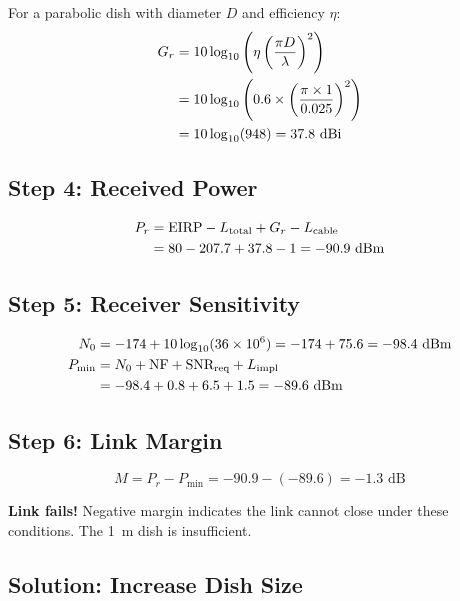 For a parabolic dish with diameter $D$ and efficiency $\eta$:
\begin{align}
G_r &= 10\log_{10}\left(\eta \left(\frac{\pi D}{\lambda}\right)^2\right) \notag \\
&= 10\log_{10}\left(0.6 \times \left(\frac{\pi \times 1}{0.025}\right)^2\right) \notag \\
&= 10\log_{10}(948) = 37.8\text{~dBi}
\label{eq:ex2-rx-gain}
\end{align}

\subsection*{Step 4: Received Power}

\begin{align}
P_r &= \text{EIRP} - L_{\text{total}} + G_r - L_{\text{cable}} \notag \\
&= 80 - 207.7 + 37.8 - 1 = -90.9\text{~dBm}
\label{eq:ex2-rx-power}
\end{align}

\subsection*{Step 5: Receiver Sensitivity}

\begin{align}
N_0 &= -174 + 10\log_{10}(36 \times 10^6) = -174 + 75.6 = -98.4\text{~dBm} \notag \\
P_{\text{min}} &= N_0 + \text{NF} + \text{SNR}_{\text{req}} + L_{\text{impl}} \notag \\
&= -98.4 + 0.8 + 6.5 + 1.5 = -89.6\text{~dBm}
\label{eq:ex2-sensitivity}
\end{align}

\subsection*{Step 6: Link Margin}

\begin{equation}
M = P_r - P_{\text{min}} = -90.9 - (-89.6) = -1.3\text{~dB}
\label{eq:ex2-margin}
\end{equation}

\begin{warningbox}
\textbf{Link fails!} Negative margin indicates the link cannot close under these conditions. The 1~m dish is insufficient.
\end{warningbox}

\subsection*{Solution: Increase Dish Size}

